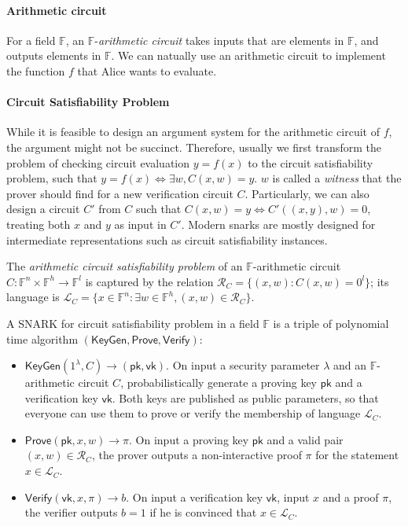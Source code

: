 \paragraph{Arithmetic circuit} For a field $\mathbb{F}$, an $\mathbb{F}$-\textit{arithmetic circuit} takes inputs that are elements in $\mathbb{F}$, and outputs elements in $\mathbb{F}$. We can natually use an arithmetic circuit to implement the function $f$ that Alice wants to evaluate. 

\paragraph{Circuit Satisfiability Problem} While it is feasible to design an argument system for the arithmetic circuit of $f$, the argument might not be succinct. Therefore, usually we first transform the problem of checking circuit evaluation $y=f(x)$ to the circuit satisfiability problem, such that $y=f(x)\iff \exists w, C(x, w)=y$. $w$ is called a \textit{witness} that the prover should find for a new verification circuit $C$. Particularly, we can also design a circuit $C'$ from $C$ such that $C(x,w)=y\iff C'((x,y), w)=0$, treating both $x$ and $y$ as input in $C'$.  Modern snarks are mostly designed for intermediate representations such as circuit satisfiability instances. 

\begin{definition}
    The \textit{arithmetic circuit satisfiability problem} of an $\mathbb{F}$-arithmetic circuit $C:\mathbb{F}^n \times \mathbb{F}^h \to \mathbb{F}^l$ is captured by the relation $\mathcal{R}_C = \{(x, w): C(x, w)=0^l\}$; its language is $\mathcal{L}_C=\{x\in \mathbb{F}^n: \exists w\in\mathbb{F}^h, (x, w)\in \mathcal{R}_C \}$.  
\end{definition}

A SNARK for circuit satisfiability problem in a field $\mathbb{F}$ is a triple of polynomial time algorithm $(\mathsf{KeyGen}, \mathsf{Prove}, \mathsf{Verify})$:
\begin{itemize}
    \item $\mathsf{KeyGen}(1^\lambda, C)\to (\mathsf{pk}, \mathsf{vk})$. On input a security parameter $\lambda$ and an $\mathbb{F}$-arithmetic circuit $C$, probabilistically generate a proving key $\mathsf{pk}$ and a verification key $\mathsf{vk}$. Both keys are published as public parameters, so that everyone can use them to prove or verify the membership of language $\mathcal{L}_C$. 
    \item $\mathsf{Prove}(\mathsf{pk}, x, w)\to \pi$. On input a proving key $\mathsf{pk}$ and a valid pair $(x, w)\in \mathcal{R}_C$, the prover outputs a non-interactive proof $\pi$ for the statement $x\in \mathcal{L}_C$. 
    \item $\mathsf{Verify}(\mathsf{vk}, x, \pi)\to b$. On input a verification key $\mathsf{vk}$, input $x$ and a proof $\pi$, the verifier outputs $b=1$ if he is convinced that $x\in \mathcal{L}_C$. 
\end{itemize}

